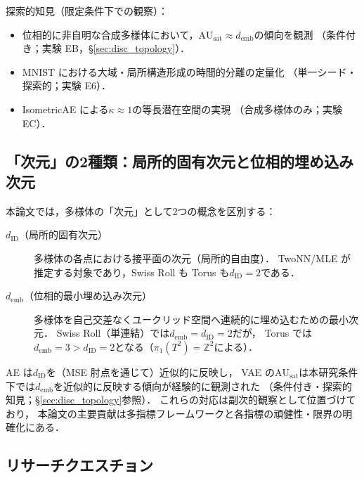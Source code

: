 \documentclass[11pt,a4paper]{jsarticle}
\newcommand{\dID}{d_{\mathrm{ID}}}
\newcommand{\kap}{\kappa}
\newcommand{\AUsat}{\mathrm{AU}_{\mathrm{sat}}}
\newcommand{\demb}{d_{\mathrm{emb}}}
\begin{document}
探索的知見（限定条件下での観察）：
\begin{itemize}
  \item 位相的に非自明な合成多様体において，$\AUsat \approx \demb$の傾向を観測
        （条件付き；実験 EB，§\ref{sec:disc_topology}）．
  \item MNIST における大域・局所構造形成の時間的分離の定量化
        （単一シード・探索的；実験 E6）．
  \item IsometricAE による$\kap \approx 1$の等長潜在空間の実現
        （合成多様体のみ；実験 EC）．
\end{itemize}

\subsection{「次元」の2種類：局所的固有次元と位相的埋め込み次元}\label{sec:intro_dim}

本論文では，多様体の「次元」として2つの概念を区別する：

\begin{description}
  \item[$\dID$（局所的固有次元）]
        多様体の各点における接平面の次元（局所的自由度）．
        TwoNN/MLE が推定する対象であり，Swiss Roll も Torus も$\dID = 2$である．
  \item[$\demb$（位相的最小埋め込み次元）]
        多様体を自己交差なくユークリッド空間へ連続的に埋め込むための最小次元．
        Swiss Roll（単連結）では$\demb = \dID = 2$だが，
        Torus では$\demb = 3 > \dID = 2$となる（$\pi_1(T^2) = \mathbb{Z}^2$による）．
\end{description}

AE は$\dID$を（MSE 肘点を通じて）近似的に反映し，
VAE の$\AUsat$は本研究条件下では$\demb$を近似的に反映する傾向が経験的に観測された
（条件付き・探索的知見；§\ref{sec:disc_topology}参照）．
これらの対応は副次的観察として位置づけており，
本論文の主要貢献は多指標フレームワークと各指標の頑健性・限界の明確化にある．

\subsection{リサーチクエスチョン}\label{sec:intro_rq}
\end{document}
